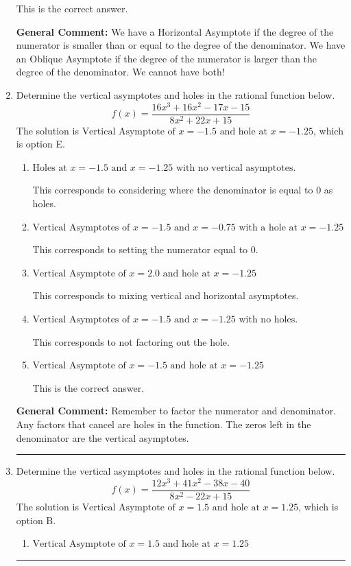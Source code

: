 \documentclass{extbook}[14pt]
\newcommand{\litem}[1]{\item #1

\rule{\textwidth}{0.4pt}}
\begin{document}
\begin{enumerate}
{\begin{enumerate}[label=\Alph*.]
This is the correct answer.
\end{enumerate}

\textbf{General Comment:} We have a Horizontal Asymptote if the degree of the numerator is smaller than or equal to the degree of the denominator. We have an Oblique Asymptote if the degree of the numerator is larger than the degree of the denominator. We cannot have both!
}
\litem{
Determine the vertical asymptotes and holes in the rational function below.
\[ f(x) = \frac{16x^{3} +16 x^{2} -17 x -15}{8x^{2} +22 x + 15} \]The solution is \( \text{Vertical Asymptote of } x = -1.5 \text{ and hole at } x = -1.25 \), which is option E.\begin{enumerate}[label=\Alph*.]
\item \( \text{Holes at } x = -1.5 \text{ and } x = -1.25 \text{ with no vertical asymptotes.} \)

This corresponds to considering where the denominator is equal to 0 as holes.
\item \( \text{Vertical Asymptotes of } x = -1.5 \text{ and } x = -0.75 \text{ with a hole at } x = -1.25 \)

This corresponds to setting the numerator equal to 0.
\item \( \text{Vertical Asymptote of } x = 2.0 \text{ and hole at } x = -1.25 \)

This corresponds to mixing vertical and horizontal asymptotes.
\item \( \text{Vertical Asymptotes of } x = -1.5 \text{ and } x = -1.25 \text{ with no holes.} \)

This corresponds to not factoring out the hole.
\item \( \text{Vertical Asymptote of } x = -1.5 \text{ and hole at } x = -1.25 \)

This is the correct answer.
\end{enumerate}

\textbf{General Comment:} Remember to factor the numerator and denominator. Any factors that cancel are holes in the function. The zeros left in the denominator are the vertical asymptotes.
}
\litem{
Determine the vertical asymptotes and holes in the rational function below.
\[ f(x) = \frac{12x^{3} +41 x^{2} -38 x -40}{8x^{2} -22 x + 15} \]The solution is \( \text{Vertical Asymptote of } x = 1.5 \text{ and hole at } x = 1.25 \), which is option B.\begin{enumerate}[label=\Alph*.]
\item \( \text{Vertical Asymptote of } x = 1.5 \text{ and hole at } x = 1.25 \)


\end{enumerate}}
\end{enumerate}
\end{document}
